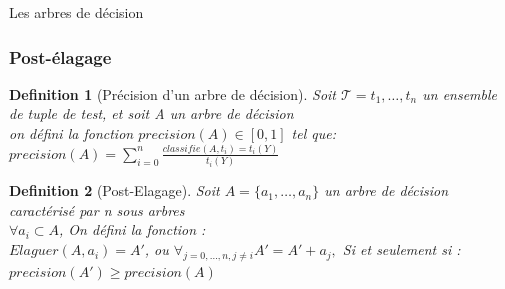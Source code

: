 \documentclass[a4paper, 11pt]{report}
\newtheorem{definition}{Definition}
\newcommand{\tupleset}{\ensuremath{\mathcal{T}}}
\begin{document}
\begin{chapter}{Les arbres de décision}
\begin{itemize}

\end{itemize}

\subsubsection{Post-élagage}




\begin{definition}[Précision d'un arbre de décision]
Soit $\tupleset=t_1,\dots,t_n$ un ensemble de tuple de test, et soit A un arbre de décision\\
on défini la fonction $precision(A) \in [0,1]$ tel que: \\
$precision(A) = \sum_{i=0}^n \frac{classifie(A,t_i) = t_i(Y)} {t_i(Y)}$
\end{definition}
\begin{definition}[Post-Elagage]

Soit $A=\{a_1,\dots,a_n\}$ un arbre de décision caractérisé par n sous arbres \\
$\forall{a_i} \subset A$, On défini la fonction : \\
$Elaguer(A,a_i) = A'$, ou $\forall{_{j=0,\dots,n, j \neq i}} A'=A'+a_j,$  Si et seulement si :\\ 

$precision(A') \geq precision(A)$

\end{definition}


\end{chapter}
\end{document}
